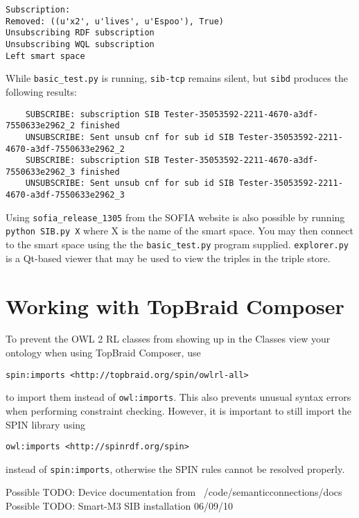 \begin{verbatim}
Subscription:
Removed: ((u'x2', u'lives', u'Espoo'), True)
Unsubscribing RDF subscription
Unsubscribing WQL subscription
Left smart space
\end{verbatim}

While \texttt{basic\_test.py} is running, \texttt{sib-tcp} remains silent, but \texttt{sibd} produces the following results:

\begin{verbatim}
	SUBSCRIBE: subscription SIB Tester-35053592-2211-4670-a3df-7550633e2962_2 finished
	UNSUBSCRIBE: Sent unsub cnf for sub id SIB Tester-35053592-2211-4670-a3df-7550633e2962_2
	SUBSCRIBE: subscription SIB Tester-35053592-2211-4670-a3df-7550633e2962_3 finished
	UNSUBSCRIBE: Sent unsub cnf for sub id SIB Tester-35053592-2211-4670-a3df-7550633e2962_3
\end{verbatim}

Using \texttt{sofia\_release\_1305} from the SOFIA website is also possible by running \verb|python SIB.py X| where X is the name of the smart space. You may then connect to the smart space using the the \texttt{basic\_test.py} program supplied.
\texttt{explorer.py} is a Qt-based viewer that may be used to view the triples in the triple store.


\section{Working with TopBraid Composer}

To prevent the OWL 2 RL classes from showing up in the Classes view your ontology when using TopBraid Composer, use 

\begin{verbatim}
spin:imports <http://topbraid.org/spin/owlrl-all>
\end{verbatim}

to import them instead of \texttt{owl:imports}. This also prevents unusual syntax errors when performing constraint checking. However, it is important to still import the SPIN library using 

\begin{verbatim}
owl:imports <http://spinrdf.org/spin>
\end{verbatim}

instead of \texttt{spin:imports}, otherwise the SPIN rules cannot be resolved properly.

Possible TODO: Device documentation from ~/code/semanticconnections/docs
Possible TODO: Smart-M3 SIB installation 06/09/10